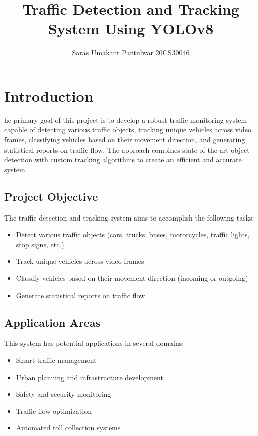 \documentclass[9pt,a4paper,twoside]{rho-class/rho}
\title{Traffic Detection and Tracking System Using YOLOv8}
\author[1]{Saras Umakant Pantulwar 20CS30046}
\affil[1]{Department of Computer Science and Engineering}
\begin{document}
	
    \maketitle
    \thispagestyle{firststyle}
    \tableofcontents
    \newpage




\section{Introduction}

    he primary goal of this project is to develop a robust traffic monitoring system capable of detecting various traffic objects, tracking unique vehicles across video frames, classifying vehicles based on their movement direction, and generating statistical reports on traffic flow. The approach combines state-of-the-art object detection with custom tracking algorithms to create an efficient and accurate system.
    
    \subsection{Project Objective}
    
    The traffic detection and tracking system aims to accomplish the following tasks:
    
    \begin{itemize}
        \item Detect various traffic objects (cars, trucks, buses, motorcycles, traffic lights, stop signs, etc.)
        \item Track unique vehicles across video frames
        \item Classify vehicles based on their movement direction (incoming or outgoing)
        \item Generate statistical reports on traffic flow
    \end{itemize}
    
    \subsection{Application Areas}
    
    This system has potential applications in several domains:
    
    \begin{itemize}
        \item Smart traffic management
        \item Urban planning and infrastructure development
        \item Safety and security monitoring
        \item Traffic flow optimization
        \item Automated toll collection systems
    \end{itemize}
\end{document}
